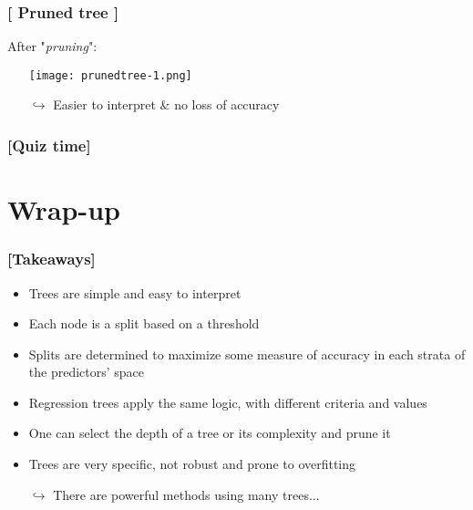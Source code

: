 \documentclass[xcolor=x11names,compress, handhouts]{beamer}
\renewcommand{\(}{\begin{columns}}
\renewcommand{\)}{\end{columns}}
\newcommand{\<}[1]{\begin{column}{#1}}
\renewcommand{\>}{\end{column}}
\begin{document}
\begin{frame}
\frametitle{\textcolor{brique}{[ Pruned tree ]}}
After "\textit{pruning}":
\pause
\begin{itemize}[<+->]
    \item[] \texttt{[image: prunedtree-1.png]}
    \item[$\hookrightarrow$] Easier to interpret \& no loss of accuracy
\end{itemize}
\end{frame}

                  


\begin{frame} %
\frametitle{\textcolor{brique}{[Quiz time]}}
\pause
\begin{itemize}[<+->]
  \item[]
\end{itemize}
\end{frame}

\section{Wrap-up}

\begin{frame} %
\frametitle{\textcolor{brique}{[Takeaways]}}
\begin{itemize}[<+->]
\item Trees are simple and easy to interpret
\item Each node is a split based on a threshold
\item Splits are determined to maximize some measure of accuracy in each strata of the predictors' space
\item Regression trees apply the same logic, with different criteria and values
\item One can select the depth of a tree or its complexity and prune it
\item Trees are very specific, not robust and prone to overfitting
\item[$\hookrightarrow$] There are powerful methods using many trees...

\end{itemize}
\end{frame}
\end{document}
